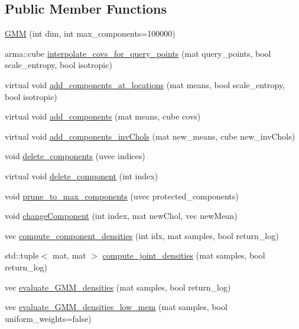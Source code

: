 \subsection*{Public Member Functions}
\begin{DoxyCompactItemize}
\item 
\hyperlink{classGMM_a84d95fb2c6582568a9d9a1b0efe200a4}{G\+MM} (int dim, int max\+\_\+components=100000)
\item 
arma\+::cube \hyperlink{classGMM_a5b867d2bbe2d3eebbd871bd1e99eabd2}{interpolate\+\_\+covs\+\_\+for\+\_\+query\+\_\+points} (mat query\+\_\+points, bool scale\+\_\+entropy, bool isotropic)
\item 
virtual void \hyperlink{classGMM_a16b4be29710b9754b3276c649ede42b5}{add\+\_\+components\+\_\+at\+\_\+locations} (mat means, bool scale\+\_\+entropy, bool isotropic)
\item 
virtual void \hyperlink{classGMM_ae33b6f52e8585c0cd590fd1d509956b0}{add\+\_\+components} (mat means, cube covs)
\item 
virtual void \hyperlink{classGMM_a07d7ade16c34458f6cf8fad958728c98}{add\+\_\+components\+\_\+inv\+Chols} (mat new\+\_\+means, cube new\+\_\+inv\+Chols)
\item 
void \hyperlink{classGMM_a82a84a6ad3ca8f5943b2ecaece9b6d1c}{delete\+\_\+components} (uvec indices)
\item 
virtual void \hyperlink{classGMM_a25c1ccd0c99b1ebd1e36592b912e74c2}{delete\+\_\+component} (int index)
\item 
void \hyperlink{classGMM_a929918e74c549b6ccca8c3cc246cd809}{prune\+\_\+to\+\_\+max\+\_\+components} (uvec protected\+\_\+components)
\item 
void \hyperlink{classGMM_a95ec14bd0e19af434ecb7b892288c6de}{change\+Component} (int index, mat new\+Chol, vec new\+Mean)
\item 
vec \hyperlink{classGMM_abcf7aa873a9bc0df374ff1284de786bc}{compute\+\_\+component\+\_\+densities} (int idx, mat samples, bool return\+\_\+log)
\item 
std\+::tuple$<$ mat, mat $>$ \hyperlink{classGMM_a8a9e502395f9d7f6a63eb7f56df5a73f}{compute\+\_\+joint\+\_\+densities} (mat samples, bool return\+\_\+log)
\item 
vec \hyperlink{classGMM_a1c2d04636a640ce56bf245df750e97ea}{evaluate\+\_\+\+G\+M\+M\+\_\+densities} (mat samples, bool return\+\_\+log)
\item 
vec \hyperlink{classGMM_ab7e827d443107567eb5c4e5791158005}{evaluate\+\_\+\+G\+M\+M\+\_\+densities\+\_\+low\+\_\+mem} (mat samples, bool uniform\+\_\+weights=false)

\end{DoxyCompactItemize}
